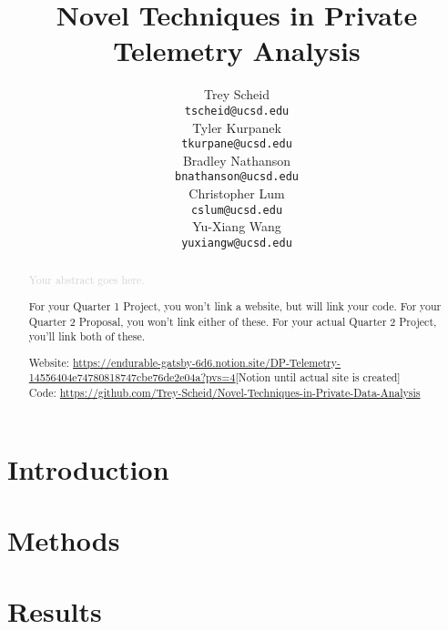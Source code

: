 \documentclass[12pt,letterpaper]{article}
\title{Novel Techniques in Private Telemetry Analysis}
\author{Trey Scheid \\
  {\tt tscheid@ucsd.edu} \\\And
  Tyler Kurpanek \\
  {\tt tkurpane@ucsd.edu} \\\And
  Bradley Nathanson \\
  {\tt bnathanson@ucsd.edu} \\\And
  Christopher Lum \\
  {\tt cslum@ucsd.edu} \\\And
  Yu-Xiang Wang \\
  {\tt yuxiangw@ucsd.edu} \\}
\begin{document}
\maketitle




\begin{abstract}
    \textcolor{LightGrey}{Your abstract goes here.}

{\color{blue} For your Quarter 1 Project, you won't link a website, but will link your code. For your Quarter 2 Proposal, you won't link either of these. For your actual Quarter 2 Project, you'll link both of these.}
\begin{center}

Website: \url{https://endurable-gatsby-6d6.notion.site/DP-Telemetry-14556404e74780818747cbe76de2e04a?pvs=4}[Notion until actual site is created] \\
Code: \url{https://github.com/Trey-Scheid/Novel-Techniques-in-Private-Data-Analysis}

\end{center}
\end{abstract}




\maketoc


\clearpage


\section{Introduction}





\section{Methods}





\section{Results}
\end{document}

